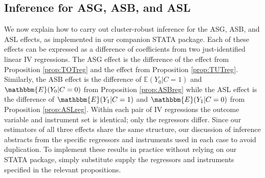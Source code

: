 \subsection{Inference for ASG, ASB, and ASL}
We now explain how to carry out cluster-robust inference for the ASG, ASB, and ASL effects, as implemented in our companion STATA package.
Each of these effects can be expressed as a difference of coefficients from two just-identified linear IV regressions.
The ASG effect is the difference of the  effect from Proposition \ref{prop:TOTreg} and the  effect from Proposition \ref{prop:TUTreg}.
Similarly, the ASB effect is the difference of $\mathbb{E}(Y_0|C=1)$ and $\mathbbm{E}(Y_0|C=0)$ from Proposition \ref{prop:ASBreg} while the ASL effect is the difference of $\mathbbm{E}(Y_1|C=1)$ and $\mathbbm{E}(Y_1|C=0)$ from Proposition \ref{prop:ASLreg}.
Within each pair of IV regressions the outcome variable and instrument set is identical; only the regressors differ. 
Since our estimators of all three effects share the same structure, our discussion of inference abstracts from the specific regressors and instruments used in each case to avoid duplication. 
To implement these results in practice without relying on our STATA package, simply substitute supply the regressors and instruments specified in the relevant propositions. 

